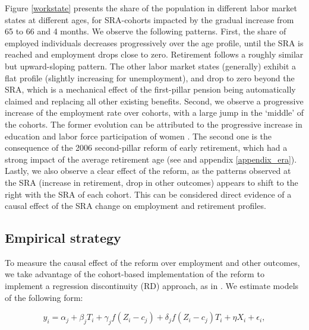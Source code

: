 \documentclass[12pt,a4paper]{article}
\begin{document}
Figure \ref{workstate} presents the share of the population in different labor market states at different ages, for SRA-cohorts impacted by the gradual increase from 65 to 66 and 4 months. We observe the following patterns. First, the share of employed individuals decreases progressively over the age profile, until the SRA is reached and employment drops close to zero. Retirement follows a roughly similar but upward-sloping pattern. The other labor market states (generally) exhibit a flat profile (slightly increasing for unemployment), and drop to zero beyond the SRA, which is a mechanical effect of the first-pillar pension being automatically claimed and replacing all other existing benefits. %
Second, we observe a progressive increase of the employment rate over cohorts, with a large jump in the `middle' of the cohorts. The former evolution can be attributed to the progressive increase in education and labor force participation of women \citep{CPB_2018}. The second one is the consequence of the 2006 second-pillar reform of early retirement, which had a strong impact of the average retirement age (see \cite{lindeboom_montizaan_2020} and appendix \ref{appendix_era}). Lastly, we also observe a clear effect of the reform, as the patterns observed at the SRA (increase in retirement, drop in other outcomes) appears to shift to the right with the SRA of each cohort. This can be considered direct evidence of a causal effect of the SRA change on employment and retirement profiles. 

\subsection{Empirical strategy}\label{sec_strategy}

To measure the causal effect of the reform over employment and other outcomes, we take advantage of the cohort-based implementation of the reform to implement a regression discontinuity (RD) approach, as in \cite{geyer_closing_2021}. %
We estimate models of the following form: 

\begin{equation}
	\label{eq_RD_gen}
	y_{i} = \alpha_j  + \beta_{j}  T_{i} + \gamma_{j} f(Z_{i} - c_j)  + \delta_j f(Z_{i} - c_j) T_{i} + \eta X_{i} + \epsilon_{i},
\end{equation}
\end{document}

